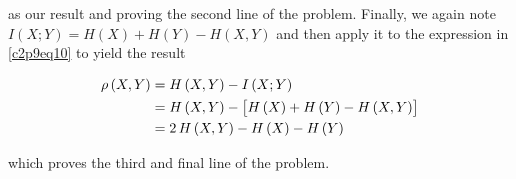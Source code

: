 \documentclass[ClusteringConnectionsMAIN.tex]{subfiles}
\begin{document}
as our result and proving the second line of the problem.  Finally, we again note $I \left( X; Y \right) = H \left( X \right) + H \left( Y \right) - H \left( X, Y \right)$ and then apply it to the expression in \ref{c2p9eq10} to yield the result

\begin{align} 
\rho \left( X, Y \right) &= H \left( X, Y \right) - I \left( X; Y \right)   \notag \\
&= H \left( X, Y \right) - \bigl[ H \left( X \right) + H \left( Y \right) - H \left( X, Y \right) \bigr]  \notag \\
&= 2 \, H \left( X, Y \right) - H \left( X \right) - H \left( Y \right)   \notag
\end{align}

which proves the third and final line of the problem.
\end{document}
